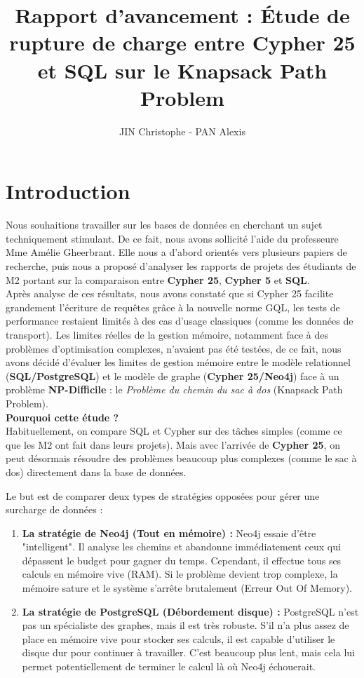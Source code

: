 \documentclass{article}
\title{Rapport d'avancement : Étude de rupture de charge entre Cypher 25 et SQL sur le Knapsack Path Problem}
\author{JIN Christophe - PAN Alexis}
\date{}
\begin{document}
    \maketitle

    \section{Introduction}

    Nous souhaitions travailler sur les bases de données en cherchant un sujet techniquement stimulant. De ce fait, nous avons sollicité l'aide du professeure Mme Amélie Gheerbrant. Elle nous a d'abord orientés vers plusieurs papiers de recherche, puis nous a proposé d'analyser les rapports de projets des étudiants de M2 portant sur la comparaison entre \textbf{Cypher 25}, \textbf{Cypher 5} et \textbf{SQL}. \\

    Après analyse de ces résultats, nous avons constaté que si Cypher 25 facilite grandement l'écriture de requêtes grâce à la nouvelle norme GQL, les tests de performance restaient limités à des cas d'usage classiques (comme les données de transport). Les limites réelles de la gestion mémoire, notamment face à des problèmes d'optimisation complexes, n'avaient pas été testées, de ce fait, nous avons décidé d'évaluer les limites de gestion mémoire entre le modèle relationnel (\textbf{SQL/PostgreSQL}) et le modèle de graphe (\textbf{Cypher 25/Neo4j}) face à un problème \textbf{NP-Difficile} : le \textit{Problème du chemin du sac à dos} (Knapsack Path Problem). \\

    \textbf{Pourquoi cette étude ?} \\
    Habituellement, on compare SQL et Cypher sur des tâches simples (comme ce que les M2 ont fait dans leurs projets). Mais avec l'arrivée de \textbf{Cypher 25}, on peut désormais résoudre des problèmes beaucoup plus complexes (comme le sac à dos) directement dans la base de données. 

    Le but est de comparer deux types de stratégies opposées pour gérer une surcharge de données :

    \begin{enumerate}
        \item \textbf{La stratégie de Neo4j (Tout en mémoire) :} Neo4j essaie d'être "intelligent". Il analyse les chemins et abandonne immédiatement ceux qui dépassent le budget pour gagner du temps. Cependant, il effectue tous ses calculs en mémoire vive (RAM). Si le problème devient trop complexe, la mémoire sature et le système s'arrête brutalement (Erreur Out Of Memory).
            
        \item \textbf{La stratégie de PostgreSQL (Débordement disque) :} PostgreSQL n'est pas un spécialiste des graphes, mais il est très robuste. S'il n'a plus assez de place en mémoire vive pour stocker ses calculs, il est capable d'utiliser le disque dur pour continuer à travailler. C'est beaucoup plus lent, mais cela lui permet potentiellement de terminer le calcul là où Neo4j échouerait.
    \end{enumerate}
\end{document}
